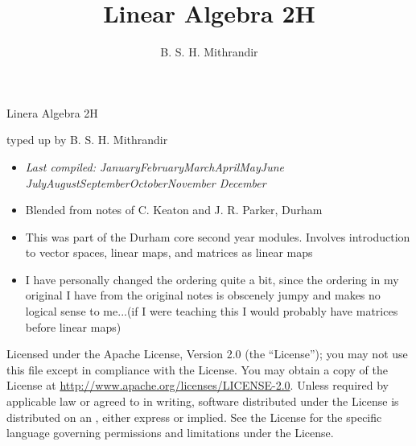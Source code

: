 \documentclass[letter-paper]{tufte-book}
\title{Linear Algebra 2H}
\author[]{B. S. H. Mithrandir}
\newcommand{\monthyear}{%
  \ifcase\month\or January\or February\or March\or April\or May\or June\or
  July\or August\or September\or October\or November\or
  December\fi\space\number\year
}
\begin{document}



\chapter*{}

\begin{fullwidth}

\par \begin{center}{\Huge Linera Algebra 2H}\end{center}

\vspace*{5mm}

\par \begin{center}{\Large typed up by B. S. H. Mithrandir}\end{center}

\vspace*{5mm}

\begin{itemize}
  \item \textit{Last compiled: \monthyear}
  \item Blended from notes of C. Keaton and J. R. Parker, Durham
  \item This was part of the Durham core second year modules. Involves
  introduction to vector spaces, linear maps, and matrices as linear maps
  \item I have personally changed the ordering quite a bit, since the ordering
  in my original I have from the original notes is obscenely jumpy and makes no
  logical sense to me...(if I were teaching this I would probably have matrices
  before linear maps)
\end{itemize}

\par

\par Licensed under the Apache License, Version 2.0 (the ``License''); you may
not use this file except in compliance with the License. You may obtain a copy
of the License at \url{http://www.apache.org/licenses/LICENSE-2.0}. Unless
required by applicable law or agreed to in writing, software distributed under
the License is distributed on an , either express or implied. See the License for the
specific language governing permissions and limitations under the License.
\end{fullwidth}
\end{document}

